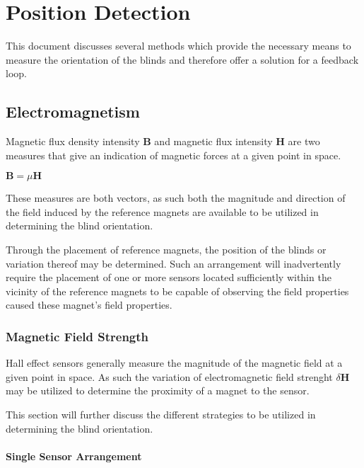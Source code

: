 \documentclass[]{article}
\author{David Asabina}
\date{}
\begin{document}
\section{Position Detection}\label{position-detection}

This document discusses several methods which provide the necessary
means to measure the orientation of the blinds and therefore offer a
solution for a feedback loop.

\subsection{Electromagnetism}\label{electromagnetism}

Magnetic flux density intensity $\mathbf{B}$ and magnetic flux intensity
$\mathbf{H}$ are two measures that give an indication of magnetic forces
at a given point in space.

$\mathbf{B} = \mu\mathbf{H}$

These measures are both vectors, as such both the magnitude and
direction of the field induced by the reference magnets are available to be 
utilized in determining the blind
orientation.

Through the placement of reference magnets, the position of the blinds or 
variation thereof may be determined. Such an arrangement will inadvertently 
require the placement of one or more sensors located sufficiently within the 
vicinity of the reference magnets to be capable of observing the field 
properties caused these magnet's field properties.

\subsubsection{Magnetic Field Strength}\label{magnetic-field-strength}

Hall effect sensors generally measure the magnitude of the magnetic
field at a given point in space. As such the variation of
electromagnetic field strenght $\delta\mathbf{H}$ may be utilized to
determine the proximity of a magnet to the sensor.

This section will further discuss the different strategies to be
utilized in determining the blind orientation.

\paragraph{Single Sensor Arrangement}\label{single-sensor-arrangement}
\end{document}
